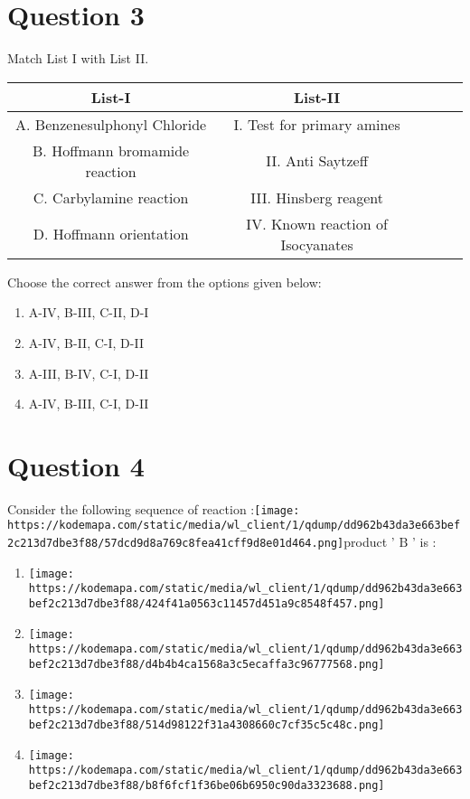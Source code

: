 \documentclass{article}
\begin{document}
\section*{Question 3}
Match List I with List II.\begin{tabular}{|c|c|c|c|c|}
\hline
List-I & List-II \\
\hline
A. Benzenesulphonyl Chloride & I. Test for primary amines \\
\hline
B. Hoffmann bromamide reaction & II. Anti Saytzeff \\
\hline
C. Carbylamine reaction & III. Hinsberg reagent \\
\hline
D. Hoffmann orientation & IV. Known reaction of Isocyanates \\
\hline
\end{tabular}
Choose the correct answer from the options given below: \newline
\begin{enumerate}[label=(\alph*)]
\item A-IV, B-III, C-II, D-I
\item A-IV, B-II, C-I, D-II
\item A-III, B-IV, C-I, D-II
\item A-IV, B-III, C-I, D-II
\end{enumerate}
\newpage
\section*{Question 4}
Consider the following sequence of reaction :\texttt{[image: https://kodemapa.com/static/media/wl\_client/1/qdump/dd962b43da3e663bef2c213d7dbe3f88/57dcd9d8a769c8fea41cff9d8e01d464.png]}\newlineThe product ' \(\mathrm{B}\) ' is : 
\begin{enumerate}[label=(\alph*)]
\item \texttt{[image: https://kodemapa.com/static/media/wl\_client/1/qdump/dd962b43da3e663bef2c213d7dbe3f88/424f41a0563c11457d451a9c8548f457.png]}
\item \texttt{[image: https://kodemapa.com/static/media/wl\_client/1/qdump/dd962b43da3e663bef2c213d7dbe3f88/d4b4b4ca1568a3c5ecaffa3c96777568.png]}
\item \texttt{[image: https://kodemapa.com/static/media/wl\_client/1/qdump/dd962b43da3e663bef2c213d7dbe3f88/514d98122f31a4308660c7cf35c5c48c.png]}
\item \texttt{[image: https://kodemapa.com/static/media/wl\_client/1/qdump/dd962b43da3e663bef2c213d7dbe3f88/b8f6fcf1f36be06b6950c90da3323688.png]}
\end{enumerate}
\newpage
\end{document}

